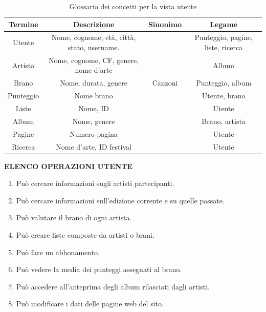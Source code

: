\documentclass{article}
\begin{document}
\begin{table}[h]
    \centering
    \begin{tabular}{|c|c|c|c|}
        \hline
          \textbf{Termine} & \textbf{Descrizione}  & \textbf{Sinonimo} & \textbf{Legame} \\
         \hline
         Utente & Nome, cognome, età, città, stato, username.  &  & Punteggio, pagine, liste, ricerca \\
         \hline
         Artista & Nome, cognome, CF, genere, nome d'arte  &  & Album \\
         \hline
         Brano&Nome, durata, genere &Canzoni  &Punteggio, album \\
         \hline
         Punteggio& Nome brano  &  &Utente, brano \\
         \hline
         Liste&Nome, ID  &  &Utente \\
         \hline
         Album&Nome, genere &  &Brano, artista \\
         \hline
         Pagine& Numero pagina  &  &Utente \\
         \hline
         Ricerca& Nome d'arte, ID festival &  & Utente \\
         \hline
    \end{tabular}
    \caption{Glossario dei concetti per la vista utente}
    \label{tab:glossario_utente}
    
\end{table}

\noindent\textbf{ELENCO OPERAZIONI UTENTE}
\begin{enumerate}
\item Può cercare informazioni sugli artisti partecipanti.
\item Può cercare informazioni sull'edizione corrente e su quelle passate.
\item Può valutare il brano di ogni artista.
\item Può creare liste composte da artisti o brani.
\item Può fare un abbonamento.
\item Può vedere la media dei punteggi assegnati al brano.
\item Può accedere all'anteprima degli album rilasciati dagli artisti.
\item Può modificare i dati delle pagine web del sito.
\end {enumerate}
\end{document}
